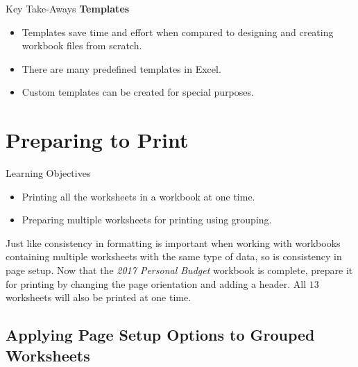 \begin{center}
	\begin{tkwbox}{Key Take-Aways}
		\textbf{Templates}
		\\
		\begin{itemize}
			\setlength{\itemsep}{0pt}
			\setlength{\parskip}{0pt}
			\setlength{\parsep}{0pt}
			
			\item Templates save time and effort when compared to designing and creating workbook files from scratch.
			\item There are many predefined templates in Excel.
			\item Custom templates can be created for special purposes.
			
		\end{itemize}
	\end{tkwbox}
\end{center}

\section{Preparing to Print}

\begin{center}
	\begin{objbox}{Learning Objectives}
		\begin{itemize}
			\setlength{\itemsep}{0pt}
			\setlength{\parskip}{0pt}
			\setlength{\parsep}{0pt}
			
			\item Printing all the worksheets in a workbook at one time.
			\item Preparing multiple worksheets for printing using grouping.
			
		\end{itemize}
	\end{objbox}
\end{center}

Just like consistency in formatting is important when working with workbooks containing multiple worksheets with the same type of data, so is consistency in page setup. Now that the \textit{2017 Personal Budget} workbook is complete, prepare it for printing by changing the page orientation and adding a header. All $ 13 $ worksheets will also be printed at one time.

\subsection{Applying Page Setup Options to Grouped Worksheets}

